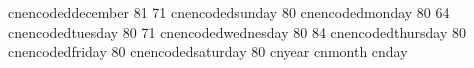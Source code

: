    cnencodeddecember         { {81} {71}}
   cnencodedsunday           { {80}}
   cnencodedmonday           { {80} {64}}
   cnencodedtuesday          { {80} {71}}
   cnencodedwednesday        { {80} {84}}
   cnencodedthursday         { {80}}
   cnencodedfriday           { {80}}
   cnencodedsaturday         { {80}}
   cnyear                    {}
   cnmonth                   {}
   cnday                     {}






